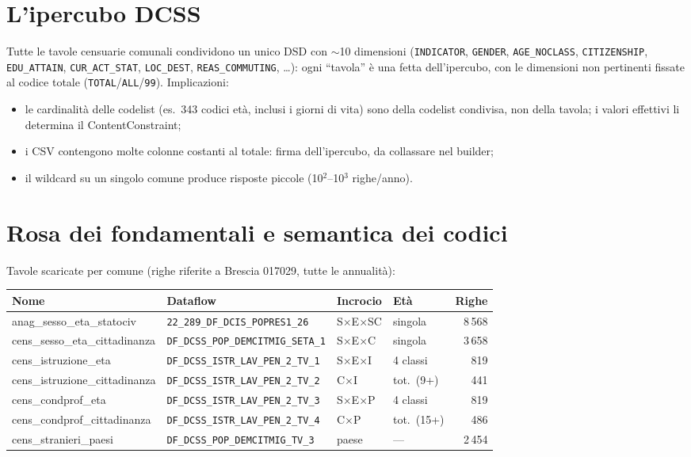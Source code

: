 \documentclass[11pt,a4paper]{article}
\newcommand{\code}[1]{\texttt{#1}}
\newcommand{\flow}[1]{\texttt{\small #1}}
\begin{document}
\section{L'ipercubo DCSS}
\label{sec:ipercubo}
Tutte le tavole censuarie comunali condividono un unico DSD con $\sim$10
dimensioni (\code{INDICATOR}, \code{GENDER}, \code{AGE\_NOCLASS},
\code{CITIZENSHIP}, \code{EDU\_ATTAIN}, \code{CUR\_ACT\_STAT}, \code{LOC\_DEST},
\code{REAS\_COMMUTING}, \dots): ogni ``tavola'' \`e una fetta dell'ipercubo, con
le dimensioni non pertinenti fissate al codice totale
(\code{TOTAL}/\code{ALL}/\code{99}). Implicazioni:
\begin{itemize}[leftmargin=*]
  \item le cardinalit\`a delle codelist (es.\ 343 codici et\`a, inclusi i giorni
  di vita) sono della codelist condivisa, non della tavola; i valori effettivi li
  determina il ContentConstraint;
  \item i CSV contengono molte colonne costanti al totale: firma dell'ipercubo,
  da collassare nel builder;
  \item il wildcard su un singolo comune produce risposte piccole
  (10$^2$--10$^3$ righe/anno).
\end{itemize}

\section{Rosa dei fondamentali e semantica dei codici}
\label{sec:rosa}
Tavole scaricate per comune (righe riferite a Brescia 017029, tutte le
annualit\`a):

\begin{center}
\small
\begin{tabular}{@{}llllr@{}}
\toprule
\textbf{Nome} & \textbf{Dataflow} & \textbf{Incrocio} & \textbf{Et\`a} & \textbf{Righe}\\
\midrule
anag\_sesso\_eta\_statociv & \flow{22\_289\_DF\_DCIS\_POPRES1\_26} & S$\times$E$\times$SC & singola & 8\,568\\
cens\_sesso\_eta\_cittadinanza & \flow{DF\_DCSS\_POP\_DEMCITMIG\_SETA\_1} & S$\times$E$\times$C & singola & 3\,658\\
cens\_istruzione\_eta & \flow{DF\_DCSS\_ISTR\_LAV\_PEN\_2\_TV\_1} & S$\times$E$\times$I & 4 classi & 819\\
cens\_istruzione\_cittadinanza & \flow{DF\_DCSS\_ISTR\_LAV\_PEN\_2\_TV\_2} & C$\times$I & tot.\ (9+) & 441\\
cens\_condprof\_eta & \flow{DF\_DCSS\_ISTR\_LAV\_PEN\_2\_TV\_3} & S$\times$E$\times$P & 4 classi & 819\\
cens\_condprof\_cittadinanza & \flow{DF\_DCSS\_ISTR\_LAV\_PEN\_2\_TV\_4} & C$\times$P & tot.\ (15+) & 486\\
cens\_stranieri\_paesi & \flow{DF\_DCSS\_POP\_DEMCITMIG\_TV\_3} & paese & --- & 2\,454\\
\bottomrule
\end{tabular}
\end{center}
\end{document}
